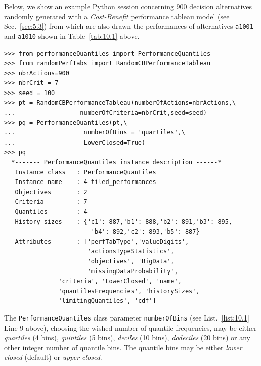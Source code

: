 Below, we show an example Python session concerning 900 decision alternatives randomly generated with a \emph{Cost-Benefit} performance tableau model (see Sec.~\ref{sec:5.3}) from which are also drawn the performances of alternatives \texttt{a1001} and \texttt{a1010} shown in Table~\vref{tab:10.1} above.
\begin{lstlisting}[caption={Computing performance quantiles from a given performance tableau},label=list:10.1]
>>> from performanceQuantiles import PerformanceQuantiles
>>> from randomPerfTabs import RandomCBPerformanceTableau
>>> nbrActions=900
>>> nbrCrit = 7
>>> seed = 100
>>> pt = RandomCBPerformanceTableau(numberOfActions=nbrActions,\
...                  numberOfCriteria=nbrCrit,seed=seed)
>>> pq = PerformanceQuantiles(pt,\
...                   numberOfBins = 'quartiles',\
...                   LowerClosed=True)
>>> pq
  *------- PerformanceQuantiles instance description ------*
   Instance class   : PerformanceQuantiles
   Instance name    : 4-tiled_performances
   Objectives       : 2
   Criteria         : 7
   Quantiles        : 4
   History sizes    : {'c1': 887,'b1': 888,'b2': 891,'b3': 895,
                        'b4': 892,'c2': 893,'b5': 887}
   Attributes       : ['perfTabType','valueDigits',
                       'actionsTypeStatistics',
                       'objectives', 'BigData',
                       'missingDataProbability',
		       'criteria', 'LowerClosed', 'name',
		       'quantilesFrequencies', 'historySizes',
		       'limitingQuantiles', 'cdf']
\end{lstlisting}
The \texttt{PerformanceQuantiles} class parameter \texttt{numberOfBins} (see List.~\vref{list:10.1} Line 9 above), choosing the wished number of quantile frequencies, may be either \emph{quartiles} (4 bins), \emph{quintiles} (5 bins), \emph{deciles} (10 bins), \emph{dodeciles} (20 bins) or any other integer number of quantile bins. The quantile bins may be either \emph{lower closed} (default) or \emph{upper-closed}.

